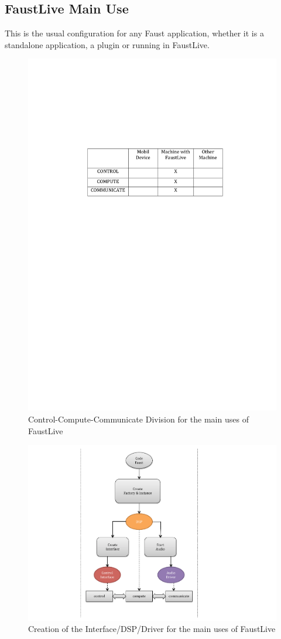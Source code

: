 \documentclass[a4paper]{article}
\begin{document}
\subsection{FaustLive Main Use}
This is the usual configuration for any Faust application, whether it is a standalone application, a plugin or running in FaustLive.
\begin{figure}[!h]
\begin{center}
\includegraphics[width=0.7\columnwidth]{images/1CCC}
\caption{Control-Compute-Communicate Division for the main uses of FaustLive}
\label{fig:1CCC}
\end{center}
\end{figure}

\begin{figure}[!h]
\begin{center}
\includegraphics[width=\columnwidth]{images/CCC1}
\caption{Creation of the Interface/DSP/Driver for the main uses of FaustLive}
\label{fig:CCC1}
\end{center}
\end{figure}
\end{document}
